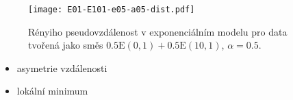 \documentclass[11pt,a4paper]{beamer}
\begin{document}
\begin{frame}
\begin{figure}
	\texttt{[image: E01-E101-e05-a05-dist.pdf]}	
	\caption{ Rényiho pseudovzdálenost v exponenciálním modelu pro data tvořená jako směs $0.5\mathrm{E}(0,1) + 0.5\mathrm{E}(10,1)$, $\alpha = 0.5.$}
\end{figure}
\begin{itemize}
	\item asymetrie vzdálenosti 
	\item lokální minimum
\end{itemize}
\end{frame}


%
%
\end{document}
